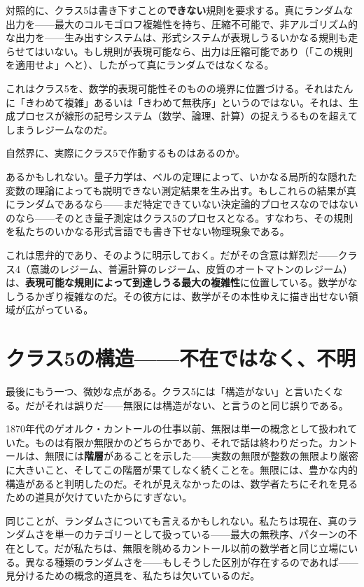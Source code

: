 \documentclass[11pt, twoside, openright]{book}
\begin{document}
対照的に、クラス5は書き下すことの\textbf{できない}規則を要求する。真にランダムな出力を------最大のコルモゴロフ複雑性を持ち、圧縮不可能で、非アルゴリズム的な出力を------生み出すシステムは、形式システムが表現しうるいかなる規則も走らせてはいない。もし規則が表現可能なら、出力は圧縮可能であり（「この規則を適用せよ」へと）、したがって真にランダムではなくなる。

これはクラス5を、数学的表現可能性そのものの境界に位置づける。それはたんに「きわめて複雑」あるいは「きわめて無秩序」というのではない。それは、生成プロセスが線形の記号システム（数学、論理、計算）の捉えうるものを超えてしまうレジームなのだ。

自然界に、実際にクラス5で作動するものはあるのか。

あるかもしれない。量子力学は、ベルの定理によって、いかなる局所的な隠れた変数の理論によっても説明できない測定結果を生み出す。もしこれらの結果が真にランダムであるなら------まだ特定できていない決定論的プロセスなのではないのなら------そのとき量子測定はクラス5のプロセスとなる。すなわち、その規則を私たちのいかなる形式言語でも書き下せない物理現象である。

これは思弁的であり、そのように明示しておく。だがその含意は鮮烈だ------クラス4（意識のレジーム、普遍計算のレジーム、皮質のオートマトンのレジーム）は、\textbf{表現可能な規則によって到達しうる最大の複雑性}に位置している。数学がなしうるかぎり複雑なのだ。その彼方には、数学がその本性ゆえに描き出せない領域が広がっている。

\section*{クラス5の構造------不在ではなく、不明}

最後にもう一つ、微妙な点がある。クラス5には「構造がない」と言いたくなる。だがそれは誤りだ------無限には構造がない、と言うのと同じ誤りである。

1870年代のゲオルク・カントールの仕事以前、無限は単一の概念として扱われていた。ものは有限か無限かのどちらかであり、それで話は終わりだった。カントールは、無限には\textbf{階層}があることを示した------実数の無限が整数の無限より厳密に大きいこと、そしてこの階層が果てしなく続くことを。無限には、豊かな内的構造があると判明したのだ。それが見えなかったのは、数学者たちにそれを見るための道具が欠けていたからにすぎない。

同じことが、ランダムさについても言えるかもしれない。私たちは現在、真のランダムさを単一のカテゴリーとして扱っている------最大の無秩序、パターンの不在として。だが私たちは、無限を眺めるカントール以前の数学者と同じ立場にいる。異なる種類のランダムさを------もしそうした区別が存在するのであれば------見分けるための概念的道具を、私たちは欠いているのだ。
\end{document}
